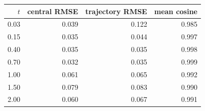 \begin{tabular}{@{}rrrr@{}}
\toprule
$t$ & central RMSE & trajectory RMSE & mean cosine \\
\midrule
0.03 & 0.039 & 0.122 & 0.985 \\
0.15 & 0.035 & 0.044 & 0.997 \\
0.40 & 0.035 & 0.035 & 0.998 \\
0.70 & 0.032 & 0.035 & 0.999 \\
1.00 & 0.061 & 0.065 & 0.992 \\
1.50 & 0.079 & 0.083 & 0.990 \\
2.00 & 0.060 & 0.067 & 0.991 \\
\bottomrule
\end{tabular}
